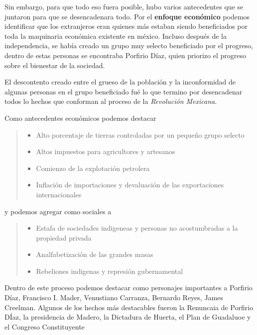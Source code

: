 \documentclass[12pt]{article}
\begin{document}
		\par Sin embargo, para que todo eso fuera posible, hubo varios antecedentes que se juntaron para que se desencadenara todo. Por el \textbf{enfoque econ\'omico} podemos identificar que los extranjeros eran quienes m\'as estaban siendo beneficiados por toda la maquinaria econ\'omica existente en m\'exico. Incluso despu\'es de la independencia, se hab\'ia creado un grupo muy selecto beneficiado por el progreso, dentro de estas personas se encontraba Porfirio D\'iaz, quien priorizo el progreso sobre el bienestar de la sociedad. 
		\par El descontento creado entre el grueso de la poblaci\'on y la inconformidad de algunas personas en el grupo beneficiado fu\'e lo que termino por desencadenar todos lo hechos que conforman al proceso de la \textit{Revoluci\'on Mexicana}.
		\par Como antecedentes econ\'omicos podemos destacar
		
		\begin{quote}\begin{itemize}
			\item Alto porcentaje de tierras controladas por un peque\~no grupo selecto
			\item Altos impuestos para agricultores y artesanos
			\item Comienzo de la explotaci\'on petrolera
			\item Inflaci\'on de importaciones y devaluaci\'on de las exportaciones internacionales
		\end{itemize}\end{quote}
		y podemos agregar como sociales a
		
		\begin{quote}\begin{itemize}
			\item Estafa de sociedades indigeneas y personas no acostumbradas a la propiedad privada
			\item Analfabetización de las grandes masas
			\item Rebeliones indigenas y represi\'on gubernamental
		\end{itemize}\end{quote}
		
		\par Dentro de este proceso podemos destacar como personajes importantes a Porfirio D\'iaz, Francisco I. Mader, Venustiano Carranza, Bernardo Reyes, James Creelman. Algunos de los hechos m\'as destacables fueron la Renuncaia de Porfirio D\'Iaz, la presidencia de Madero, la Dictadura de Huerta, el Plan de Guadaluoe y el Congreso Constituyente
\end{document}
